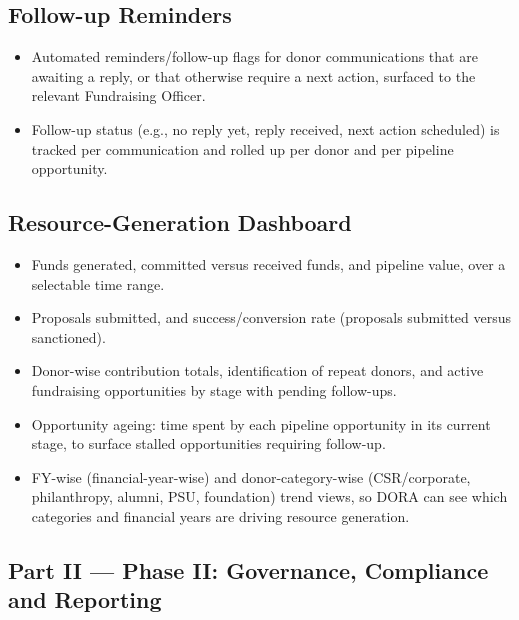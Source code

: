 \documentclass[11pt]{article}
\begin{document}
\subsection{Follow-up Reminders}
\label{sec:followup}
\begin{itemize}[leftmargin=1.4em, itemsep=3pt]
\item Automated reminders/follow-up flags for donor communications that are awaiting a reply, or that otherwise require a next action, surfaced to the relevant Fundraising Officer.
\item Follow-up status (e.g., no reply yet, reply received, next action scheduled) is tracked per communication and rolled up per donor and per pipeline opportunity.
\end{itemize}

\subsection{Resource-Generation Dashboard}
\label{sec:dashboard1}
\begin{itemize}[leftmargin=1.4em, itemsep=3pt]
\item Funds generated, committed versus received funds, and pipeline value, over a selectable time range.
\item Proposals submitted, and success/conversion rate (proposals submitted versus sanctioned).
\item Donor-wise contribution totals, identification of repeat donors, and active fundraising opportunities by stage with pending follow-ups.
\item Opportunity ageing: time spent by each pipeline opportunity in its current stage, to surface stalled opportunities requiring follow-up.
\item FY-wise (financial-year-wise) and donor-category-wise (CSR/corporate, philanthropy, alumni, PSU, foundation) trend views, so DORA can see which categories and financial years are driving resource generation.
\end{itemize}

\subsection*{Part II --- Phase II: Governance, Compliance and Reporting}
\end{document}
